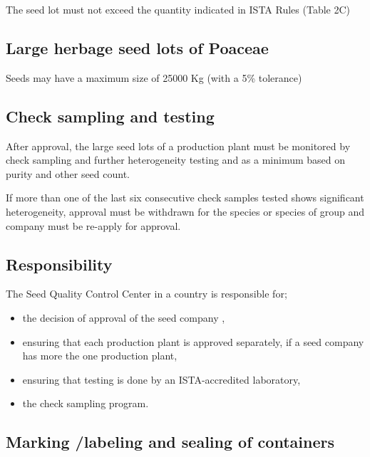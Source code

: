 \documentclass[
]{book}
\providecommand{\tightlist}{%
  \setlength{\itemsep}{0pt}\setlength{\parskip}{0pt}}
\begin{document}
The seed lot must not exceed the quantity indicated in ISTA Rules (Table 2C)

\hypertarget{large-herbage-seed-lots-of-poaceae}{%
\subsection{Large herbage seed lots of Poaceae}\label{large-herbage-seed-lots-of-poaceae}}

Seeds may have a maximum size of 25000 Kg (with a 5\% tolerance)

\hypertarget{check-sampling-and-testing}{%
\subsection{Check sampling and testing}\label{check-sampling-and-testing}}

After approval, the large seed lots of a production plant must be monitored by check sampling and further heterogeneity testing and as a minimum based on purity and other seed count.

If more than one of the last six consecutive check samples tested shows significant heterogeneity, approval must be withdrawn for the species or species of group and company must be re-apply for approval.

\hypertarget{responsibility}{%
\subsection{Responsibility}\label{responsibility}}

The Seed Quality Control Center in a country is responsible for;

\begin{itemize}
\tightlist
\item
  the decision of approval of the seed company ,
\item
  ensuring that each production plant is approved separately, if a seed company has more the one production plant,
\item
  ensuring that testing is done by an ISTA-accredited laboratory,
\item
  the check sampling program.
\end{itemize}

\hypertarget{marking-labeling-and-sealing-of-containers}{%
\subsection{Marking /labeling and sealing of containers}\label{marking-labeling-and-sealing-of-containers}}
\end{document}
